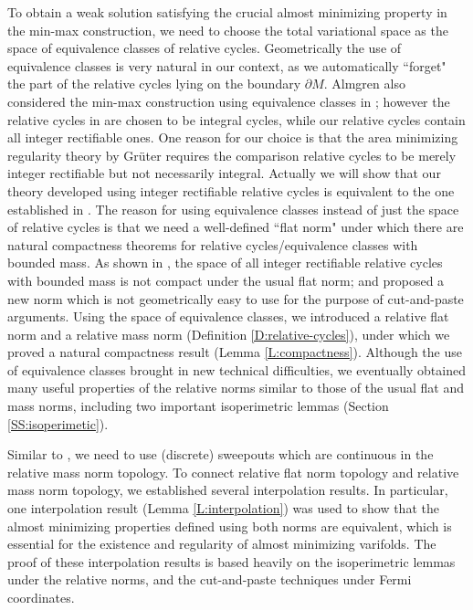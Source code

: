 \documentclass[10pt]{amsart}
\theoremstyle{definition}
\theoremstyle{remark}
\numberwithin{equation}{section}
\begin{document}
To obtain a weak solution satisfying the crucial almost minimizing property in the min-max construction, we need to choose the total variational space as the space of equivalence classes of relative cycles. Geometrically the use of equivalence classes is very natural in our context, as we automatically ``forget" the part of the relative cycles lying on the boundary $\partial M$. Almgren also considered the min-max construction using equivalence classes in \cite{Almgren62}; however the relative cycles in \cite{Almgren62} are chosen to be integral cycles, while our relative cycles contain all integer rectifiable ones. One reason for our choice is that the area minimizing regularity theory by Gr\"{u}ter \cite{Gr87} requires the comparison relative cycles to be merely integer rectifiable but not necessarily integral. Actually we will show that our theory developed using integer rectifiable relative cycles is equivalent to the one established in \cite{Almgren62}. The reason for using equivalence classes instead of just the space of relative cycles is that we need a well-defined ``flat norm" under which there are natural compactness theorems for relative cycles/equivalence classes with bounded mass. As shown in \cite[4.4.4]{Federer}, the space of all integer rectifiable relative cycles with bounded mass is not compact under the usual flat norm; and \cite[4.4.4]{Federer} proposed a new norm which is not geometrically easy to use for the purpose of cut-and-paste arguments. Using the space of equivalence classes, we introduced a relative flat norm and a relative mass norm (Definition \ref{D:relative-cycles}), under which we proved a natural compactness result (Lemma \ref{L:compactness}). Although the use of equivalence classes brought in new technical difficulties, we eventually obtained many useful properties of the relative norms similar to those of the usual flat and mass norms, including two important isoperimetric lemmas (Section \ref{SS:isoperimetic}). 

Similar to \cite{Pitts}, we need to use (discrete) sweepouts which are continuous in the relative mass norm topology. To connect relative flat norm topology and relative mass norm topology, we established several interpolation results. In particular, one interpolation result (Lemma \ref{L:interpolation}) was used to show that the almost minimizing properties defined using both norms are equivalent, which is essential for the existence and regularity of almost minimizing varifolds. The proof of these interpolation results is based heavily on the isoperimetric lemmas under the relative norms, and the cut-and-paste techniques under Fermi coordinates. 
\end{document}
